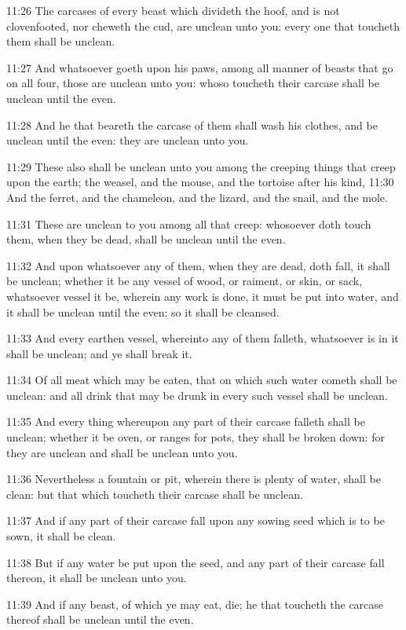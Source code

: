 11:26 The carcases of every beast which divideth the hoof, and is not clovenfooted, nor cheweth the cud, are unclean unto you: every one that toucheth them shall be unclean.

11:27 And whatsoever goeth upon his paws, among all manner of beasts that go on all four, those are unclean unto you: whoso toucheth their carcase shall be unclean until the even.

11:28 And he that beareth the carcase of them shall wash his clothes, and be unclean until the even: they are unclean unto you.

11:29 These also shall be unclean unto you among the creeping things that creep upon the earth; the weasel, and the mouse, and the tortoise after his kind, 11:30 And the ferret, and the chameleon, and the lizard, and the snail, and the mole.

11:31 These are unclean to you among all that creep: whosoever doth touch them, when they be dead, shall be unclean until the even.

11:32 And upon whatsoever any of them, when they are dead, doth fall, it shall be unclean; whether it be any vessel of wood, or raiment, or skin, or sack, whatsoever vessel it be, wherein any work is done, it must be put into water, and it shall be unclean until the even; so it shall be cleansed.

11:33 And every earthen vessel, whereinto any of them falleth, whatsoever is in it shall be unclean; and ye shall break it.

11:34 Of all meat which may be eaten, that on which such water cometh shall be unclean: and all drink that may be drunk in every such vessel shall be unclean.

11:35 And every thing whereupon any part of their carcase falleth shall be unclean; whether it be oven, or ranges for pots, they shall be broken down: for they are unclean and shall be unclean unto you.

11:36 Nevertheless a fountain or pit, wherein there is plenty of water, shall be clean: but that which toucheth their carcase shall be unclean.

11:37 And if any part of their carcase fall upon any sowing seed which is to be sown, it shall be clean.

11:38 But if any water be put upon the seed, and any part of their carcase fall thereon, it shall be unclean unto you.

11:39 And if any beast, of which ye may eat, die; he that toucheth the carcase thereof shall be unclean until the even.

